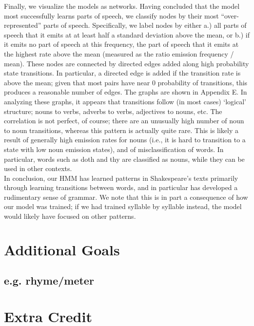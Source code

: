 Finally, we visualize the models as networks. Having concluded that the model most successfully learns parts of speech, we classify nodes by their most ``over-represented'' parts of speech. Specifically, we label nodes by either a.) all parts of speech that it emits at at least half a standard deviation above the mean, or b.) if it emits no part of speech at this frequency, the part of speech that it emits at the highest rate above the mean (measured as the ratio emission frequency / mean). These nodes are connected by directed edges added along high probability state transitions. In particular, a directed edge is added if the transition rate is above the mean; given that most pairs have near 0 probability of transitions, this produces a reasonable number of edges. The graphs are shown in Appendix E.
In analyzing these graphs, it appears that transitions follow (in most cases) `logical' structure; nouns to verbs, adverbs to verbs, adjectives to nouns, etc. The correlation is not perfect, of course; there are an unusually high number of noun to noun transitions, whereas this pattern is actually quite rare. This is likely a result of generally high emission rates for nouns (i.e., it is hard to transition to a state with low noun emission states), and of misclassification of words. In particular, words such as doth and thy are classified as nouns, while they can be used in other contexts.\\

In conclusion, our HMM has learned patterns in Shakespeare's texts primarily through learning transitions between words, and in particular has developed a rudimentary sense of grammar. We note that this is in part a consequence of how our model was trained; if we had trained syllable by syllable instead, the model would likely have focused on other patterns.\\

\section{Additional Goals}
\medskip

\subsection{e.g. rhyme/meter}


\section{Extra Credit}
\medskip

